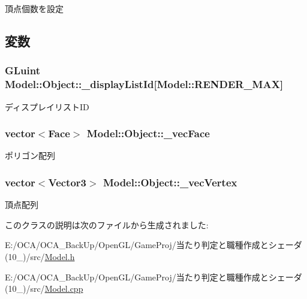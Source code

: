 頂点個数を設定 



\subsection{変数}
\hypertarget{class_model_1_1_object_a0e320a887dce26ad4fa9f6d02ccc4185}{
\subsubsection[{\-\_\-display\-List\-Id}]{\setlength{\rightskip}{0pt plus 5cm}G\-Luint Model\-::\-Object\-::\-\_\-display\-List\-Id\mbox{[}{\bf Model\-::\-R\-E\-N\-D\-E\-R\-\_\-\-M\-A\-X}\mbox{]}}}\label{class_model_1_1_object_a0e320a887dce26ad4fa9f6d02ccc4185}


ディスプレイリスト\-I\-D 

\hypertarget{class_model_1_1_object_a96a062dc6956ff172c9f0f76851af4b7}{
\subsubsection[{\-\_\-vec\-Face}]{\setlength{\rightskip}{0pt plus 5cm}vector$<${\bf Face}$>$ Model\-::\-Object\-::\-\_\-vec\-Face}}\label{class_model_1_1_object_a96a062dc6956ff172c9f0f76851af4b7}


ポリゴン配列 

\hypertarget{class_model_1_1_object_a28406f0f699e977339ff38cab8d4dc06}{
\subsubsection[{\-\_\-vec\-Vertex}]{\setlength{\rightskip}{0pt plus 5cm}vector$<${\bf Vector3}$>$ Model\-::\-Object\-::\-\_\-vec\-Vertex}}\label{class_model_1_1_object_a28406f0f699e977339ff38cab8d4dc06}


頂点配列 



このクラスの説明は次のファイルから生成されました\-:\begin{DoxyCompactItemize}
\item 
E\-:/\-O\-C\-A/\-O\-C\-A\-\_\-\-Back\-Up/\-Open\-G\-L/\-Game\-Proj/当たり判定と職種作成とシェーダ(10\-\_)/src/\hyperlink{_model_8h}{Model.\-h}\item 
E\-:/\-O\-C\-A/\-O\-C\-A\-\_\-\-Back\-Up/\-Open\-G\-L/\-Game\-Proj/当たり判定と職種作成とシェーダ(10\-\_)/src/\hyperlink{_model_8cpp}{Model.\-cpp}\end{DoxyCompactItemize}
